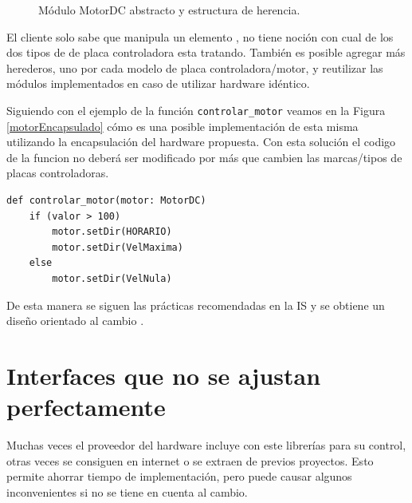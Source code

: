 \begin{figure}[H]
\caption{Módulo MotorDC abstracto y estructura de herencia.}
\label{estructuraHerencia}
\begin{center}
\end{center}
\end{figure}

El cliente solo sabe que manipula un elemento \textit{\MotorDC}, no tiene noción con cual de los dos tipos de de placa controladora esta tratando. También es posible agregar más herederos, uno por cada modelo de placa controladora/motor, y reutilizar las módulos implementados en caso de utilizar hardware idéntico.

Siguiendo con el ejemplo de la función \verb|controlar_motor| veamos en la Figura \ref{motorEncapsulado} cómo es una posible implementación de esta misma utilizando la encapsulación del hardware propuesta. Con esta solución el codigo de la funcion no deberá ser modificado por más que cambien las marcas/tipos de placas controladoras.

\begin{lstlisting}[caption=Implementación de la función controlar\_motor utilizando encapsulación del hardware.,label={motorEncapsulado}]
def controlar_motor(motor: MotorDC)
	if (valor > 100)
		motor.setDir(HORARIO)
		motor.setDir(VelMaxima)
	else
		motor.setDir(VelNula)
\end{lstlisting}

De esta manera se siguen las prácticas recomendadas en la \gls{IS} \cite{ShawGarlan1996, ghezzi2003, bass2003, DBLP:books/daglib/0030743} y se obtiene un diseño orientado al cambio \cite{Gamma:1995:DPE:186897}.

\section{Interfaces que no se ajustan perfectamente}
Muchas veces el proveedor del hardware incluye con este librerías para su control, otras veces se consiguen en internet o se extraen de previos proyectos. Esto permite ahorrar tiempo de implementación, pero puede causar algunos inconvenientes si no se tiene en cuenta al cambio.

